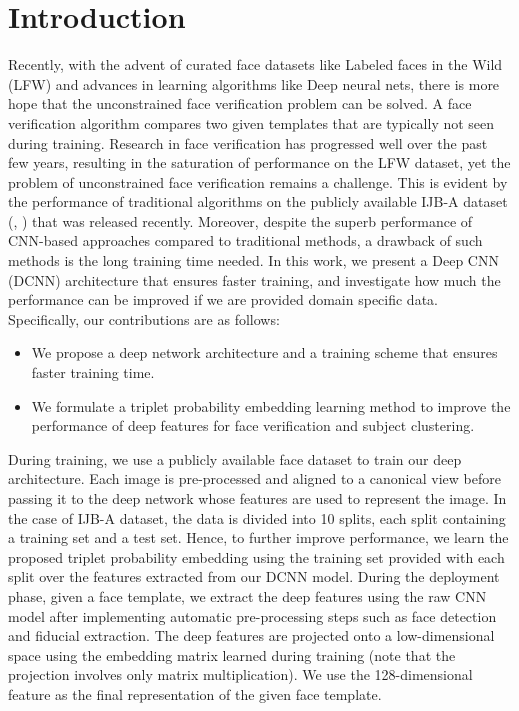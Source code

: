 \documentclass[10pt,twocolumn,letterpaper]{article}
\begin{document}
\section{Introduction}
\label{sec:intro}
Recently, with the advent of curated face datasets like Labeled faces in the
Wild (LFW) \cite{lfw} and advances in learning algorithms like Deep neural nets,
there is more hope that the unconstrained face verification problem can be
solved. A face verification algorithm compares two given templates that are
typically not seen during training. Research in face verification has progressed
well over the past few years, resulting in the saturation of performance on the
LFW dataset, yet the problem of unconstrained face verification remains a
challenge. This is evident by the performance of traditional algorithms on the
publicly available IJB-A dataset (\cite{ijba15}, \cite{fvff15}) that was
released recently. Moreover, despite the superb performance of CNN-based
approaches compared to traditional methods, a drawback of such methods is the
long training time needed. In this work, we present a Deep CNN (DCNN)
architecture that ensures faster training, and investigate how much the
performance can be improved if we are provided domain specific data.
Specifically, our contributions are as follows:
\begin{itemize}
\item We propose a deep network architecture and a training scheme that ensures
  faster training time.
\item We formulate a triplet probability embedding learning method to improve
  the performance of deep features for face verification and subject clustering.
\end{itemize}



During training, we use a publicly available face dataset to train our deep
architecture. Each image is pre-processed and aligned to a canonical view before
passing it to the deep network whose features are used to represent the image. In the case of IJB-A dataset, the data is divided into 10 splits, each split containing a training set and a test set. Hence, to further improve performance, we learn the proposed triplet probability embedding using the training set provided with each split over the features extracted from our DCNN model. During the deployment phase, given a face template, we extract the deep features using the raw CNN model after implementing automatic pre-processing steps such as face detection and fiducial extraction. The deep features are projected onto
a low-dimensional space using the embedding matrix learned during training (note
that the projection involves only matrix multiplication). We use the
128-dimensional feature as the final representation of the given face template. 
\end{document}
